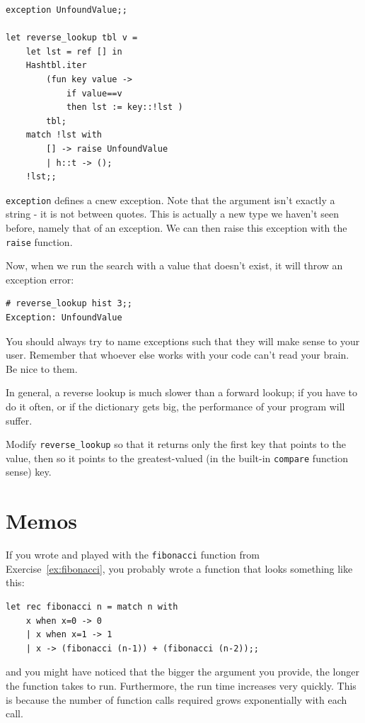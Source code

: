 \documentclass[10pt]{book}
\begin{document}
\beforeverb
\begin{verbatim}
exception UnfoundValue;;

let reverse_lookup tbl v = 
	let lst = ref [] in
	Hashtbl.iter
		(fun key value ->
			if value==v
			then lst := key::!lst )
		tbl;
	match !lst with
		[] -> raise UnfoundValue
		| h::t -> ();
	!lst;;
\end{verbatim}
\afterverb
{\tt exception} defines a cnew exception. Note that the argument isn't exactly a string - it is not between quotes. This is actually a new type we haven't seen before, namely that of an exception. We can then raise this exception with the {\tt raise} function.

Now, when we run the search with a value that doesn't exist, it will throw an exception error:

\beforeverb
\begin{verbatim}
# reverse_lookup hist 3;;
Exception: UnfoundValue
\end{verbatim}
\afterverb

You should always try to name exceptions such that they will make sense to your user. Remember that whoever else works with your code can't read your brain. Be nice to them.

In general, a reverse lookup is much slower than a forward lookup; if you
have to do it often, or if the dictionary gets big, the performance
of your program will suffer.

\begin{ex}
Modify \verb"reverse_lookup" so that it returns only the first key that points to the value, then so it points to the greatest-valued (in the built-in {\tt compare} function sense) key.
\end{ex}

\section{Memos}
If you wrote and played with the {\tt fibonacci} function from
Exercise~\ref{ex:fibonacci}, you probably wrote a function that looks something like this:
\beforeverb
\begin{verbatim}
let rec fibonacci n = match n with
	x when x=0 -> 0
	| x when x=1 -> 1
	| x -> (fibonacci (n-1)) + (fibonacci (n-2));;
\end{verbatim}
\afterverb
and you might have noticed that the bigger
the argument you provide, the longer the function takes to run.
Furthermore, the run time increases very quickly. This is because the
number of function calls required grows exponentially with each call.
\end{document}
